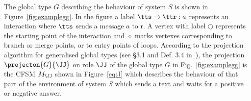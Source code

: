 The global type $G$ describing the behaviour of system $S$ is shown in Figure~\ref{fig:examplegg}.
In the figure a label $\tts\rightarrow \ttr : a$ represents an interaction where $\tts$ sends a message
$a$ to r. A vertex with label {\small $\bigcirc$} represents the starting point of the interaction
and {\huge $\diamond$}\hspace{-8.5pt}{$^+$} marks vertexes corresponding
to branch or merge points, or to entry points of loops.
According to the projection algorithm for generalised global types (see \S 3.1 and Def. 3.4 in~\cite{DY12}), the projection $\projecton{G}{\JJ}$ on role $\JJ$ of the global type $G$ in Fig.~\ref{fig:examplegg}  is the  CFSM $M_\JJ$ shown in Figure~\ref{eq:J}
which describes the behaviour of that part of the environment of system $S$ which sends a text and waits for a positive or negative answer.


